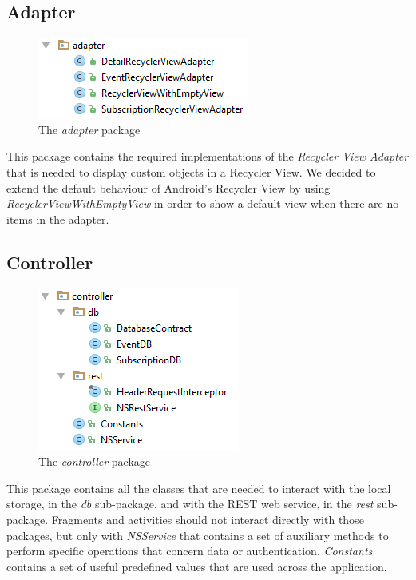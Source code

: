 \documentclass[a4paper]{scrreprt}
\begin{document}
\subsection{Adapter}
\begin{figure}[H]
	\centering
	\includegraphics{pack_adapter}
	\caption{The \emph{adapter} package}
\end{figure}
This package contains the required implementations of the \emph{Recycler View Adapter} that is needed to display custom objects in a Recycler View. We decided to extend the default behaviour of Android's Recycler View by using \emph{RecyclerViewWithEmptyView} in order to show a default view when there are no items in the adapter.

\subsection{Controller}
\begin{figure}[H]
	\centering
	\includegraphics{pack_controller}
	\caption{The \emph{controller} package}
\end{figure}
This package contains all the classes that are needed to interact with the local storage, in the \emph{db} sub-package, and with the REST web service, in the \emph{rest} sub-package. Fragments and activities should not interact directly with those packages, but only with \emph{NSService} that contains a set of auxiliary methods to perform specific operations that concern data or authentication. \emph{Constants} contains a set of useful predefined values that are used across the application.
\end{document}
